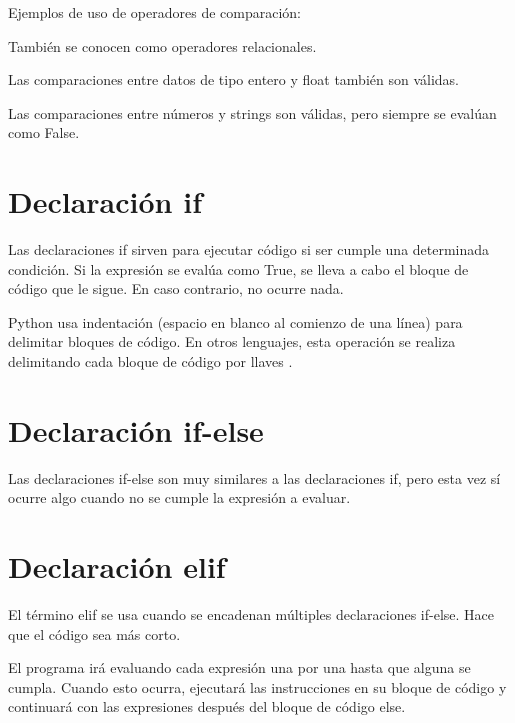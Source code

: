 \documentclass{report}
\begin{document}
Ejemplos de uso de operadores de comparación:


También se conocen como operadores relacionales.

Las comparaciones entre datos de tipo entero y float también son válidas.


Las comparaciones entre números y strings son válidas, pero siempre se evalúan como False.


\section{Declaración if}

Las declaraciones if sirven para ejecutar código si ser cumple una determinada condición. Si la expresión se evalúa como True, se lleva a cabo el bloque de código que le sigue. En caso contrario, no ocurre nada.


Python usa indentación (espacio en blanco al comienzo de una línea) para delimitar bloques de código. En otros lenguajes, esta operación se realiza delimitando cada bloque de código por llaves {}.

\section{Declaración if-else}

Las declaraciones if-else son muy similares a las declaraciones if, pero esta vez sí ocurre algo cuando no se cumple la expresión a evaluar.



\section{Declaración elif}

El término elif se usa cuando se encadenan múltiples declaraciones if-else. Hace que el código sea más corto.


El programa irá evaluando cada expresión una por una hasta que alguna se cumpla. Cuando esto ocurra, ejecutará las instrucciones en su bloque de código y continuará con las expresiones después del bloque de código else.
\end{document}
